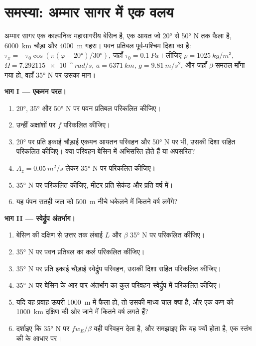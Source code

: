 \section{समस्या: अम्मार सागर में एक वलय}

\begin{problem}
\label{pb:b3:ocean-dynamics:1}
अम्मार सागर एक काल्पनिक महासागरीय बेसिन है, एक आयत जो \ang{20} से
\ang{50} N तक फैला है, \qty{6000}{km} चौड़ा और \qty{4000}{m} गहरा। पवन प्रतिबल
पूर्व-पश्चिम दिशा का है: $\tau_x = -\tau_0\cos(\pi(\varphi - \ang{20})/\ang{30})$, जहाँ $\tau_0
= \qty{0.1}{Pa}$। लीजिए $\rho = \qty{1025}{kg/m^3}$, $\Omega =
\qty{7.292115e-5}{rad/s}$, $a = \qty{6371}{km}$, $g = \qty{9.81}{m/s^2}$,
और जहाँ $\beta$-समतल माँगा गया हो, वहाँ \ang{35} N पर उसका मान।

\medskip\noindent\textbf{भाग I --- एकमन परत।}
\begin{enumerate}
\item \ang{20}, \ang{35} और \ang{50} N पर पवन प्रतिबल परिकलित कीजिए।
\item उन्हीं अक्षांशों पर $f$ परिकलित कीजिए।
\item \ang{20} पर प्रति इकाई चौड़ाई एकमन आयतन परिवहन और
  \ang{50} N पर भी, उसकी दिशा सहित परिकलित कीजिए। क्या परिवहन बेसिन में
  अभिसरित होते हैं या अपसरित?
\item $A_z = \qty{0.05}{m^2/s}$ लेकर \ang{35} N पर  परिकलित कीजिए।
\item \ang{35} N पर  परिकलित कीजिए, मीटर प्रति सेकंड और प्रति
  वर्ष में।
\item यह पंपन सतही जल को
  \qty{500}{m} नीचे धकेलने में कितने वर्ष लगेंगे?
\end{enumerate}

\medskip\noindent\textbf{भाग II --- स्वेर्द्रुप अंतर्भाग।}
\begin{enumerate}[resume]
\item बेसिन की दक्षिण से उत्तर तक लंबाई $L$ और $\beta$
  \ang{35} N पर परिकलित कीजिए।
\item \ang{35} N पर पवन प्रतिबल का कर्ल परिकलित कीजिए।
\item \ang{35} N पर प्रति इकाई चौड़ाई स्वेर्द्रुप परिवहन, उसकी
  दिशा सहित परिकलित कीजिए।
\item \ang{35} N पर बेसिन के आर-पार अंतर्भाग का कुल परिवहन
  स्वेर्द्रुप में परिकलित कीजिए।
\item यदि यह प्रवाह ऊपरी \qty{1000}{m} में फैला हो, तो उसकी
  माध्य चाल क्या है, और एक कण को \qty{1000}{km}
  दक्षिण की ओर जाने में कितने वर्ष लगते हैं?
\item दर्शाइए कि \ang{35} N पर $fw_E/\beta$ वही परिवहन देता है, और
  समझाइए कि यह क्यों होता है, एक स्तंभ की  के आधार पर।
\end{enumerate}


\end{problem}
